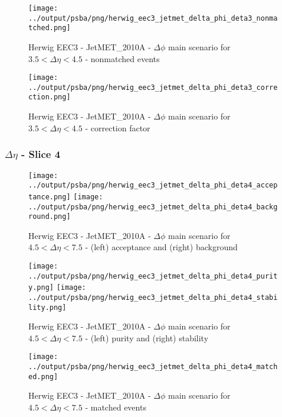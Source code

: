 \documentclass[11pt]{book}
\begin{document}
\begin{figure}[ht]
\centering
\texttt{[image: ../output/psba/png/herwig\_eec3\_jetmet\_delta\_phi\_deta3\_nonmatched.png]}
\caption{Herwig EEC3 - JetMET\_2010A - $\Delta\phi$ main scenario for $3.5 < \Delta\eta < 4.5$ - nonmatched events}
\label{fig:hw_eec3_jetmet_delta_phi_deta3_nonmatched}
\end{figure}

\begin{figure}[ht]
\centering
\texttt{[image: ../output/psba/png/herwig\_eec3\_jetmet\_delta\_phi\_deta3\_correction.png]}
\caption{Herwig EEC3 - JetMET\_2010A - $\Delta\phi$ main scenario for $3.5 < \Delta\eta < 4.5$ - correction factor}
\label{fig:hw_eec3_jetmet_delta_phi_deta3_correction}
\end{figure}


\clearpage
\subsubsection{$\Delta\eta$ - Slice 4}

\begin{figure}[ht]
\centering
\texttt{[image: ../output/psba/png/herwig\_eec3\_jetmet\_delta\_phi\_deta4\_acceptance.png]}
\texttt{[image: ../output/psba/png/herwig\_eec3\_jetmet\_delta\_phi\_deta4\_background.png]}
\caption{Herwig EEC3 - JetMET\_2010A - $\Delta\phi$ main scenario for $4.5 < \Delta\eta < 7.5$ - (left) acceptance and (right) background}
\label{fig:hw_eec3_jetmet_delta_phi_deta4_ab}
\end{figure}

\begin{figure}[ht]
\centering
\texttt{[image: ../output/psba/png/herwig\_eec3\_jetmet\_delta\_phi\_deta4\_purity.png]}
\texttt{[image: ../output/psba/png/herwig\_eec3\_jetmet\_delta\_phi\_deta4\_stability.png]}
\caption{Herwig EEC3 - JetMET\_2010A - $\Delta\phi$ main scenario for $4.5 < \Delta\eta < 7.5$ - (left) purity and (right) stability}
\label{fig:hw_eec3_jetmet_delta_phi_deta4_ps}
\end{figure}

\begin{figure}[ht]
\centering
\texttt{[image: ../output/psba/png/herwig\_eec3\_jetmet\_delta\_phi\_deta4\_matched.png]}
\caption{Herwig EEC3 - JetMET\_2010A - $\Delta\phi$ main scenario for $4.5 < \Delta\eta < 7.5$ - matched events}
\label{fig:hw_eec3_jetmet_delta_phi_deta4_matched}
\end{figure}
\end{document}
